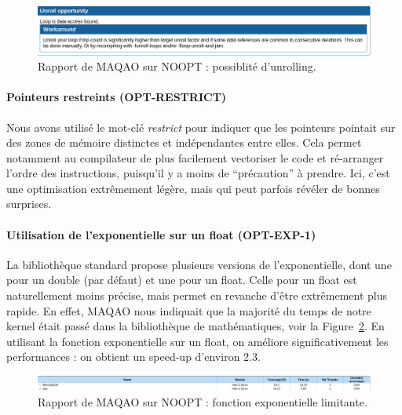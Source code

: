 \documentclass[12pt,a4paper]{article}
\begin{document}
\begin{figure}[h]
    \centering
    \includegraphics[scale=0.4]{./figures/L1/maqao_noopt_unroll.png}
    \caption{Rapport de MAQAO sur NOOPT : possiblité d'unrolling.}
    \label{fig.maqao_noopt_unroll}
\end{figure}

\paragraph{Pointeurs restreints (OPT-RESTRICT)}
Nous avons utilisé le mot-clé \textit{restrict} pour indiquer que les pointeurs
pointait sur des zones de mémoire distinctes et indépendantes entre elles. Cela
permet notamment au compilateur de plus facilement vectoriser le code et
ré-arranger l'ordre des instructions, puisqu'il y a moins de
\enquote{précaution} à prendre. Ici, c'est une optimisation extrêmement légère,
mais qui peut parfois révéler de bonnes surprises.

\paragraph{Utilisation de l'exponentielle sur un float (OPT-EXP-1)} La
bibliothèque standard propose plusieurs versions de l'exponentielle, dont une
pour un double (par défaut) et une pour un float. Celle pour un float est
naturellement moins précise, mais permet en revanche d'être extrêmement plus
rapide. En effet, MAQAO nous indiquait que la majorité du temps de notre kernel
était passé dans la bibliothèque de mathématiques, voir la
Figure~\ref{fig.maqao_noopt_bottleneck}. En utilisant la fonction exponentielle
sur un float, on améliore significativement les performances : on obtient un
speed-up d'environ $2.3$.

\begin{figure}[h]
    \centering
    \includegraphics[scale=0.25]{./figures/L1/maqao_noopt_bottleneck.png}
    \caption{Rapport de MAQAO sur NOOPT : fonction exponentielle limitante.}
    \label{fig.maqao_noopt_bottleneck}
\end{figure}
\end{document}
